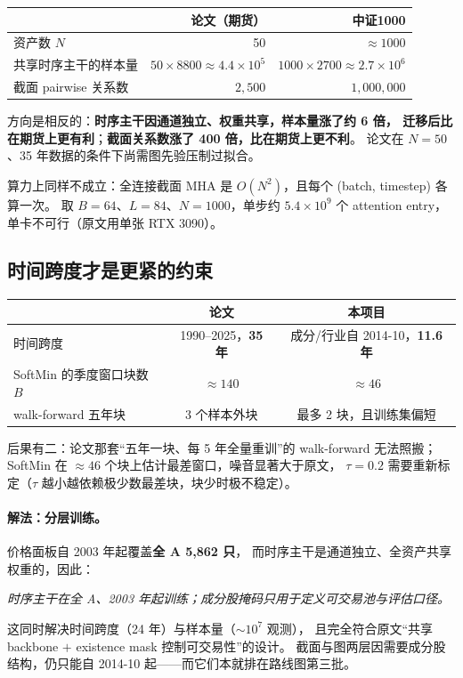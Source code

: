 \documentclass[11pt, a4paper]{ctexart}
\begin{document}
\begin{table}[h]
\centering
\small
\begin{tabular}{lrr}
\toprule
 & 论文（期货） & 中证1000 \\
\midrule
资产数 $N$ & 50 & $\approx 1000$ \\
共享时序主干的样本量 & $50\times 8800 \approx 4.4\times10^5$ & $1000\times 2700 \approx 2.7\times 10^6$ \\
截面 pairwise 关系数 & $2{,}500$ & $1{,}000{,}000$ \\
\bottomrule
\end{tabular}
\end{table}

方向是相反的：\textbf{时序主干因通道独立、权重共享，样本量涨了约 6 倍，
迁移后比在期货上更有利}；\textbf{截面关系数涨了 400 倍，比在期货上更不利}。
论文在 $N{=}50$、35 年数据的条件下尚需图先验压制过拟合。

算力上同样不成立：全连接截面 MHA 是 $O(N^2)$，且每个 (batch, timestep) 各算一次。
取 $B{=}64$、$L{=}84$、$N{=}1000$，单步约 $5.4\times 10^9$ 个 attention entry，
单卡不可行（原文用单张 RTX 3090）。

\subsection{时间跨度才是更紧的约束}

\begin{table}[h]
\centering
\small
\begin{tabular}{lcc}
\toprule
 & 论文 & 本项目 \\
\midrule
时间跨度 & 1990--2025，\textbf{35 年} & 成分/行业自 2014-10，\textbf{11.6 年} \\
SoftMin 的季度窗口块数 $B$ & $\approx 140$ & $\approx 46$ \\
walk-forward 五年块 & 3 个样本外块 & 最多 2 块，且训练集偏短 \\
\bottomrule
\end{tabular}
\end{table}

后果有二：论文那套“五年一块、每 5 年全量重训”的 walk-forward 无法照搬；
SoftMin 在 $\approx 46$ 个块上估计最差窗口，噪音显著大于原文，
$\tau{=}0.2$ 需要重新标定（$\tau$ 越小越依赖极少数最差块，块少时极不稳定）。

\paragraph{解法：分层训练。}价格面板自 2003 年起覆盖\textbf{全 A 5{,}862 只}，
而时序主干是通道独立、全资产共享权重的，因此：
\begin{center}
\emph{时序主干在全 A、2003 年起训练；成分股掩码只用于定义可交易池与评估口径。}
\end{center}
这同时解决时间跨度（24 年）与样本量（$\sim 10^7$ 观测），
且完全符合原文“共享 backbone $+$ existence mask 控制可交易性”的设计。
截面与图两层因需要成分股结构，仍只能自 2014-10 起——而它们本就排在路线图第三批。
\end{document}
